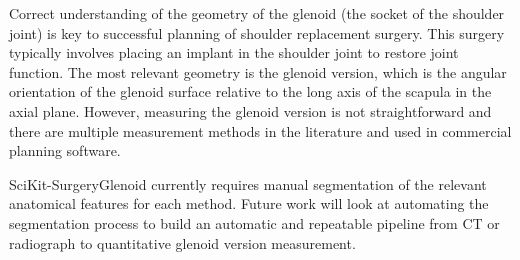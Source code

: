 
Correct understanding of the geometry of the glenoid (the socket of the shoulder joint) is 
key to successful planning of shoulder replacement surgery. This surgery typically involves 
placing an implant in the shoulder joint to restore joint function. The most relevant 
geometry is the glenoid version, which is the angular orientation of the glenoid surface 
relative to the long axis of the scapula in the axial plane. However, measuring the glenoid version is not 
straightforward and there are multiple measurement methods in the literature and used in 
commercial planning software. 



SciKit-SurgeryGlenoid currently requires manual segmentation of the relevant anatomical 
features for each method. Future work will look at automating the segmentation process
 to build an automatic and repeatable 
pipeline from {CT} or radiograph to quantitative glenoid version measurement.

